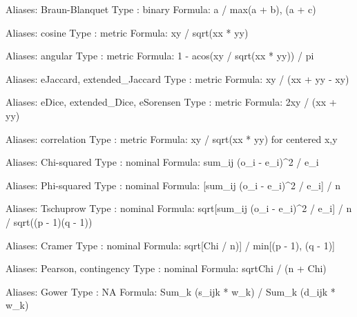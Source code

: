 \documentclass{article}
\begin{document}
\begin{Schunk}
\begin{Soutput}
Aliases: Braun-Blanquet
Type   : binary
Formula: a / max{(a + b), (a + c)}

Aliases: cosine
Type   : metric
Formula: xy / sqrt(xx * yy)

Aliases: angular
Type   : metric
Formula: 1 - acos(xy / sqrt(xx * yy)) / pi

Aliases: eJaccard, extended_Jaccard
Type   : metric
Formula: xy / (xx + yy - xy)

Aliases: eDice, extended_Dice, eSorensen
Type   : metric
Formula: 2xy / (xx + yy)

Aliases: correlation
Type   : metric
Formula: xy / sqrt(xx * yy) for centered x,y

Aliases: Chi-squared
Type   : nominal
Formula: sum_ij (o_i - e_i)^2 / e_i

Aliases: Phi-squared
Type   : nominal
Formula: [sum_ij (o_i - e_i)^2 / e_i] / n

Aliases: Tschuprow
Type   : nominal
Formula: sqrt{[sum_ij (o_i - e_i)^2 / e_i] / n / sqrt((p - 1)(q - 1))}

Aliases: Cramer
Type   : nominal
Formula: sqrt{[Chi / n)] / min[(p - 1), (q - 1)]}

Aliases: Pearson, contingency
Type   : nominal
Formula: sqrt{Chi / (n + Chi)}

Aliases: Gower
Type   : NA
Formula: Sum_k (s_ijk * w_k) / Sum_k (d_ijk * w_k)
\end{Soutput}
\end{Schunk}
\end{document}
